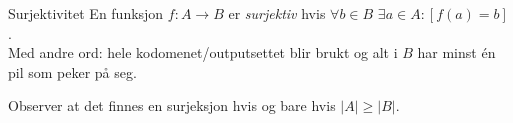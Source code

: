 \begin{frame}{Surjektivitet}
En funksjon $f : A \rightarrow B$ er \emph{surjektiv} hvis $\forall b \in B$ $\exists a \in A: [f(a) = b]$.\\
Med andre ord: hele kodomenet/outputsettet blir brukt og alt i $B$ har minst én pil som peker på seg.
    \begin{figure}%
        \centering
        \qquad
        \qquad
        \label{fig:sur}
    \end{figure}
    \pause
    Observer at det finnes en surjeksjon hvis og bare hvis $|A| \geq |B|$.
\end{frame}

